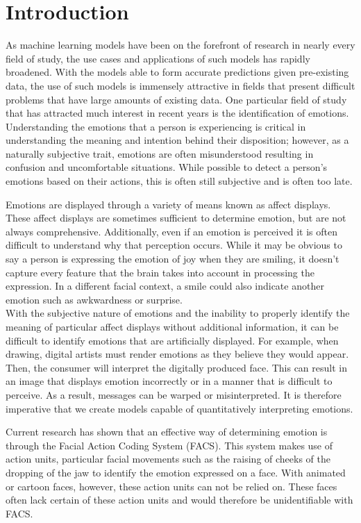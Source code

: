 \documentclass{Project}
\begin{document}
\section{Introduction}
As machine learning models have been on the forefront of research in nearly every 
field of study, the use cases and applications of such models has rapidly broadened. 
With the models able to form accurate predictions given pre-existing data, the use
of such models is immensely attractive in fields that present difficult problems that
have large amounts of existing data. One particular field of study that has attracted
much interest in recent years is the identification of emotions. Understanding the 
emotions that a person is experiencing is critical in understanding the meaning and 
intention behind their disposition; however, as a naturally subjective trait,
emotions are often misunderstood resulting in confusion and uncomfortable situations.
While possible to detect a person's emotions based on their actions, this is often 
still subjective and is often too late. 

Emotions are displayed through a variety of means known as affect displays. These
affect displays are sometimes sufficient to determine emotion, but are not always
comprehensive. Additionally, even if an emotion is perceived it is often difficult 
to understand why that perception occurs. While it may be obvious to say a person 
is expressing the emotion of joy when they are smiling, it doesn't capture every 
feature that the brain takes into account in processing the expression. In 
a different facial context, a smile could also indicate another emotion 
such as awkwardness or surprise.\\

With the subjective nature of emotions and the inability to properly identify the 
meaning of particular affect displays without additional information, it can be
difficult to identify emotions that are artificially displayed. For example, when drawing,
digital artists must render emotions as they believe they would appear. Then, the 
consumer will interpret the digitally produced face. This can result in an image 
that displays emotion incorrectly or in a manner that is difficult to perceive. 
As a result, messages can be warped or misinterpreted. It is therefore imperative 
that we create models capable of quantitatively interpreting emotions.

Current research has shown that an effective way of determining emotion is through 
the Facial Action Coding System (FACS). \cite{tian_kanade_cohn_2001}
This system makes use of action units, particular facial movements such as the 
raising of cheeks of the dropping of the jaw to identify the emotion expressed 
on a face. With animated or cartoon faces, however,
these action units can not be relied on. These faces often lack certain of these
action units and would therefore be unidentifiable with FACS. 
\end{document}
